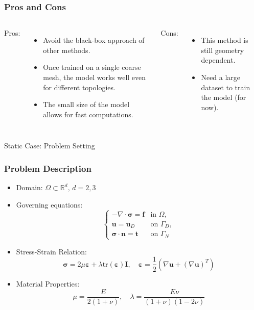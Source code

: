 \documentclass{beamer}
\begin{document}
\begin{frame}
\frametitle{Pros and Cons}
\begin{columns}
    Pros:
    \begin{itemize}
        \item Avoid the black-box approach of other methods.
        \item Once trained on a single coarse mesh, the model works well even for different topologies.
        \item The small size of the model allows for fast computations.
    \end{itemize}
    Cons:
    \begin{itemize}
        \item This method is still geometry dependent.
        \item Need a large dataset to train the model (for now).
    \end{itemize}
\end{columns}
\end{frame}

\begin{frame}{Static Case: Problem Setting}

    \frametitle{Problem Description}
    \begin{itemize}
        \item Domain: \( \Omega \subset \mathbb{R}^d, \, d = 2,3 \)
        \item Governing equations:
        \[
        \begin{cases}
            -\nabla \cdot \bm{\sigma} = \bm{f} & \text{in } \Omega, \\
            \bm{u} = \bm{u}_D & \text{on } \Gamma_D, \\
            \bm{\sigma} \cdot \bm{n} = \bm{t} & \text{on } \Gamma_N
        \end{cases}
        \]
        \item Stress-Strain Relation:
        \[
        \bm{\sigma} = 2\mu \bm{\varepsilon} + \lambda \text{tr}(\bm{\varepsilon}) \bm{I}, \quad 
        \bm{\varepsilon} = \frac{1}{2} \left( \nabla \bm{u} + (\nabla \bm{u})^T \right)
        \]
        \item Material Properties:
        \[
        \mu = \frac{E}{2(1+\nu)}, \quad \lambda = \frac{E\nu}{(1+\nu)(1-2\nu)}
        \]
    \end{itemize}
    
\end{frame}
    
\end{document}
